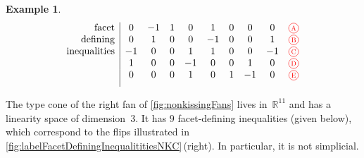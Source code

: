 \documentclass{amsart}
\theoremstyle{definition}
\newtheorem{example}[theorem]{Example}
\newcommand{\R}{\mathbb{R}} %
\newcommand{\red}{\color{red}} %
\newcommand*\circled[1]{\tikz[baseline=(char.base)]{\node[shape=circle, draw, inner sep=1.5pt, scale=.7] (char) {#1};}}
\begin{document}
\begin{example}
\[\begin{array}{r|ccccccccc}
\text{facet}		& 0 & -1 & 1 & 0 & 1 & 0 & 0 & 0 & \red \circled{A} \\
\text{defining}		& 0 & 1 & 0 & 0 & -1 & 0 & 0 & 1 & \red \circled{B} \\
\text{inequalities}	& -1 & 0 & 0 & 1 & 1 & 0 & 0 & -1 & \red \circled{C} \\
					& 1 & 0 & 0 & -1 & 0 & 0 & 1 & 0 & \red \circled{D} \\
					& 0 & 0 & 0 & 1 & 0 & 1 & -1 & 0 & \red \circled{E} \\[.2cm]
\end{array}
\]

%
%

\noindent
The type cone of the right fan of \cref{fig:nonkissingFans} lives in~$\R^{11}$ and has a linearity space of dimension~$3$.
It has $9$ facet-defining inequalities (given below), which correspond to the flips illustrated in \cref{fig:labelFacetDefiningInequalititiesNKC}\,(right).
In particular, it is not simplicial.


\end{example}
\end{document}
